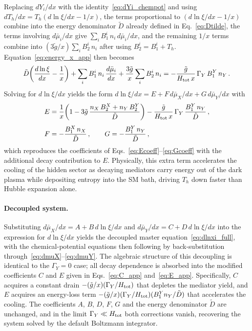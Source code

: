 \documentclass[11pt]{article}
\numberwithin{equation}{section}
\newcommand{\TD}{T_h}
\begin{document}
Replacing $dY_i/dx$ with the identity~\eqref{eq:dYi_chempot} and using $d\TD/dx = \TD(d\ln\xi/dx - 1/x)$, the terms proportional to $(d\ln\xi/dx - 1/x)$ combine into the energy denominator $\tilde D$ already defined in Eq.~\eqref{eq:Dtilde}, the terms involving $d\bar\mu_i/dx$ give $\sum_i B_1^i\,n_i\,d\bar\mu_i/dx$, and the remaining $1/x$ terms combine into $(3\tilde g/x)\sum_i B_2^i\,n_i$ after using $B_2^i = B_1^i + \TD$. Equation~\eqref{eq:energy_x_app} then becomes
\begin{equation}
  \tilde D\!\left(\frac{d\ln\xi}{dx} - \frac{1}{x}\right)
  + \sum_i B_1^i\,n_i\,\frac{d\bar\mu_i}{dx}
  + \frac{3\tilde g}{x}\sum_i B_2^i\,n_i
  = -\frac{\tilde g}{H_{\rm tot}\,x}\,\Gamma_Y\,B_1^Y\,n_Y\,.
  \label{eq:energy_compact_app}
\end{equation}
Solving for $d\ln\xi/dx$ yields the form $d\ln\xi/dx = E + F\,d\bar\mu_X/dx + G\,d\bar\mu_Y/dx$ with
\begin{align}
  E &= \frac{1}{x}\!\left(1 - 3\tilde g\,\frac{n_X\,B_2^X + n_Y\,B_2^Y}{\tilde D}\right) - \frac{\tilde g}{H_{\rm tot}\,x}\,\Gamma_Y\,\frac{B_1^Y\,n_Y}{\tilde D}\,, \label{eq:E_app}\\[4pt]
  F &= -\frac{B_1^X\,n_X}{\tilde D}\,, \qquad G = -\frac{B_1^Y\,n_Y}{\tilde D}\,,
\end{align}
which reproduces the coefficients of Eqs.~\eqref{eq:Ecoeff}--\eqref{eq:Gcoeff} with the additional decay contribution to $E$. Physically, this extra term accelerates the cooling of the hidden sector as decaying mediators carry energy out of the dark plasma while depositing entropy into the SM bath, driving $\TD$ down faster than Hubble expansion alone.
 
\paragraph{Decoupled system.}
 
Substituting $d\bar\mu_X/dx = A + B\,d\ln\xi/dx$ and $d\bar\mu_Y/dx = C + D\,d\ln\xi/dx$ into the expression for $d\ln\xi/dx$ yields the decoupled master equation~\eqref{eq:dlnxi_full}, with the chemical-potential equations then following by back-substitution through~\eqref{eq:dmuX}--\eqref{eq:dmuY}. The algebraic structure of this decoupling is identical to the $\Gamma_Y = 0$ case; all decay dependence is absorbed into the modified coefficients $C$ and $E$ given in Eqs.~\eqref{eq:C_app} and~\eqref{eq:E_app}. Specifically, $C$ acquires a constant drain $-(\tilde g/x)(\Gamma_Y/H_{\rm tot})$ that depletes the mediator yield, and $E$ acquires an energy-loss term $-(\tilde g/x)(\Gamma_Y/H_{\rm tot})(B_1^Y n_Y/\tilde D)$ that accelerates the cooling. The coefficients $A$, $B$, $D$, $F$, $G$ and the energy denominator $\tilde D$ are unchanged, and in the limit $\Gamma_Y \ll H_{\rm tot}$ both corrections vanish, recovering the system solved by the default Boltzmann integrator.
\end{document}
